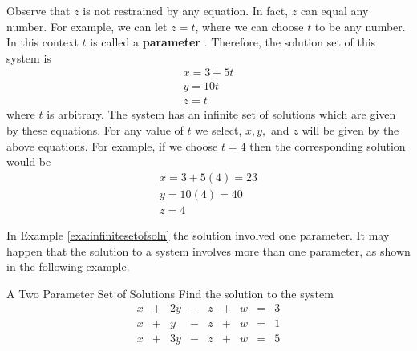 \begin{solution}
Observe that $z$ is not restrained by any equation. In fact,
 $z$ can equal any number. For example, we can let $z = t$, where we can choose $t$ to be any number.
In this context $t$ is called a \textbf{parameter} . Therefore, the solution
set of this system is 
\[
\begin{array}{c}
x=3+5t \\
y=10t \\
z=t
\end{array}
\]
where $t$ is arbitrary. The system has an infinite set of solutions which are given by these equations. For any value of $t$ we select,
$x, y,$ and $z$ will be given by the above equations. For example, if we choose $t=4$ then the corresponding solution would be 
\[
\begin{array}{c}
x = 3 + 5 (4) = 23\\
y = 10(4)=40 \\
z=4
\end{array}
\]
\end{solution}

In Example \ref{exa:infinitesetofsoln} the solution involved one parameter. It may happen that the solution
to a system involves more than one parameter, as shown in the following example.

\begin{example}{A Two Parameter Set of Solutions}\label{exa:twoparametersetofsoln}
Find the solution to the system
\begin{equation*}
\begin{array}{ccccccccc}
x&+&2y&-&z&+&w&=&3 \\
x&+&y&-&z&+&w&=&1 \\
x&+&3y&-&z&+&w&=&5
\end{array}
\end{equation*}
\end{example}

